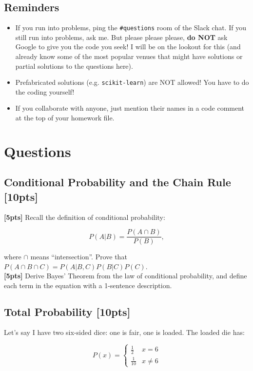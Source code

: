 \documentclass[paper=a4, fontsize=11pt]{scrartcl} %
\numberwithin{equation}{section} %
\numberwithin{figure}{section} %
\numberwithin{table}{section} %
\begin{document}
\subsection{Reminders}

\begin{itemize}
	\item If you run into problems, ping the \texttt{\#questions} room of the Slack chat. If you still run into problems, ask me. But please please please, \textbf{do NOT} ask Google to give you the code you seek! I will be on the lookout for this (and already know some of the most popular venues that might have solutions or partial solutions to the questions here).
	\item Prefabricated solutions (e.g. \texttt{scikit-learn}) are NOT allowed! You have to do the coding yourself!
	\item If you collaborate with anyone, just mention their names in a code comment at the top of your homework file.
\end{itemize}

\section*{Questions}
\setcounter{subsection}{0}

\subsection{Conditional Probability and the Chain Rule \textbf{[10pts]}}

\textbf{[5pts]} Recall the definition of conditional probability:

$$
P(A | B) = \frac{P(A \cap B)}{P(B)},
$$

where $\cap$ means ``intersection''. Prove that $P(A \cap B \cap C) = P(A | B, C) P(B | C) P(C)$. \\

\textbf{[5pts]} Derive Bayes' Theorem from the law of conditional probability, and define each term in the equation with a 1-sentence description.

\subsection{Total Probability \textbf{[10pts]}}

Let's say I have two six-sided dice: one is fair, one is loaded. The loaded die has:

$$
P(x) =
\begin{cases}
	\frac{1}{2} & x = 6 \\
	\frac{1}{10} & x \neq 6
\end{cases}
$$
\end{document}
